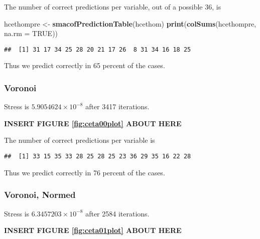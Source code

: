 \documentclass[
  12pt,
]{article}
\newenvironment{Shaded}{\begin{snugshade}}{\end{snugshade}}
\newcommand{\AttributeTok}[1]{\textcolor[rgb]{0.13,0.29,0.53}{#1}}
\newcommand{\ConstantTok}[1]{\textcolor[rgb]{0.56,0.35,0.01}{#1}}
\newcommand{\FunctionTok}[1]{\textcolor[rgb]{0.13,0.29,0.53}{\textbf{#1}}}
\newcommand{\NormalTok}[1]{#1}
\newcommand{\OtherTok}[1]{\textcolor[rgb]{0.56,0.35,0.01}{#1}}
\begin{document}
The number of correct predictions per variable, out of a possible 36, is

\begin{Shaded}
\begin{Highlighting}[]
\NormalTok{hcethompre }\OtherTok{\textless{}{-}} \FunctionTok{smacofPredictionTable}\NormalTok{(hcethom)}
\FunctionTok{print}\NormalTok{(}\FunctionTok{colSums}\NormalTok{(hcethompre, }\AttributeTok{na.rm =} \ConstantTok{TRUE}\NormalTok{))}
\end{Highlighting}
\end{Shaded}

\begin{verbatim}
##  [1] 31 17 34 25 28 20 21 17 26  8 31 34 16 18 25
\end{verbatim}

Thus we predict correctly in 65 percent of the cases.

\subsubsection{Voronoi}\label{voronoi-1}

Stress is \ensuremath{5.9054624\times 10^{-8}} after 3417 iterations.

\begin{greybox}

\begin{center}
\textbf{INSERT FIGURE \ref{fig:ceta00plot} ABOUT HERE}

\end{center}

\end{greybox}

The number of correct predictions per variable is

\begin{verbatim}
##  [1] 33 15 35 33 28 25 28 25 23 36 29 35 16 22 28
\end{verbatim}

Thus we predict correctly in 76 percent of the cases.

\subsubsection{Voronoi, Normed}\label{voronoi-normed}

Stress is \ensuremath{6.3457203\times 10^{-8}} after 2584 iterations.

\begin{greybox}

\begin{center}
\textbf{INSERT FIGURE \ref{fig:ceta01plot} ABOUT HERE}

\end{center}

\end{greybox}
\end{document}
